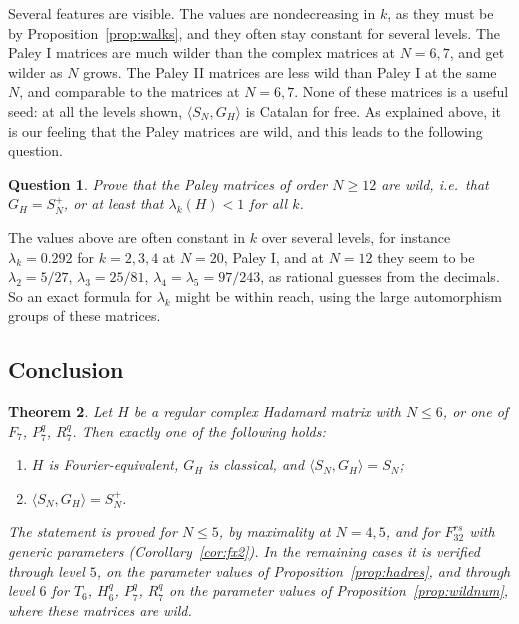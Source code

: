\documentclass[11pt]{amsart}
\newtheorem{theorem}{Theorem}[section]
\newtheorem{question}[theorem]{Question}
\theoremstyle{definition}
\theoremstyle{remark}
\theoremstyle{plain}
\numberwithin{equation}{section}
\numberwithin{table}{section}
\begin{document}
Several features are visible. The values are nondecreasing in $k$, as they must be by Proposition~\ref{prop:walks}, and they often stay constant for several levels. The Paley I matrices are much wilder than the complex matrices at $N=6,7$, and get wilder as $N$ grows. The Paley II matrices are less wild than Paley I at the same $N$, and comparable to the matrices at $N=6,7$. None of these matrices is a useful seed: at all the levels shown, $\langle S_N,G_H\rangle$ is Catalan for free. As explained above, it is our feeling that the Paley matrices are wild, and this leads to the following question.

\begin{question}\label{qu:paley}
Prove that the Paley matrices of order $N\ge12$ are wild, i.e.\ that $G_H=S_N^+$, or at least that $\lambda_k(H)<1$ for all $k$.
\end{question}

The values above are often constant in $k$ over several levels, for instance $\lambda_k=0.292$ for $k=2,3,4$ at $N=20$, Paley I, and at $N=12$ they seem to be $\lambda_2=5/27$, $\lambda_3=25/81$, $\lambda_4=\lambda_5=97/243$, as rational guesses from the decimals. So an exact formula for $\lambda_k$ might be within reach, using the large automorphism groups of these matrices.

\subsection{Conclusion}

\begin{theorem}\label{thm:hadmain}
Let $H$ be a regular complex Hadamard matrix with $N\le6$, or one of $F_7$, $P_7^q$, $R_7^q$. Then exactly one of the following holds:
\begin{enumerate}
\item $H$ is Fourier-equivalent, $G_H$ is classical, and $\langle S_N,G_H\rangle=S_N$;
\item $\langle S_N,G_H\rangle=S_N^+$.
\end{enumerate}
The statement is proved for $N\le5$, by maximality at $N=4,5$, and for $F_{32}^{rs}$ with generic parameters (Corollary~\ref{cor:fx2}). In the remaining cases it is verified through level $5$, on the parameter values of Proposition~\ref{prop:hadres}, and through level $6$ for $T_6$, $H_6^q$, $P_7^q$, $R_7^q$ on the parameter values of Proposition~\ref{prop:wildnum}, where these matrices are wild.
\end{theorem}
\end{document}

